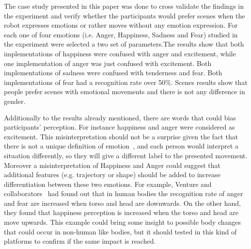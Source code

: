 The case study presented in this paper was done to cross validate the findings in the experiment and verify whether the participants would prefer scenes when the robot expresses emotions or rather moves without any emotion expression. For each one of four emotions (i.e. Anger, Happiness, Sadness and Fear) studied in the experiment were selected a two set of parameters.The results show that both implementations of happiness were confused with anger and excitement, while one implementation of anger was just confused with excitement. Both implementations of sadness were confused with tenderness and fear. Both implementations of fear had a recognition rate over 50\%. Scenes results show that people prefer scenes with emotional movements and there is not any difference in gender.

Additionally to the results already mentioned, there are words that could bias participants' perception. For instance happiness and anger were considered as excitement. This misinterpretation should not be a surprise given the fact that there is not a unique definition of emotion~\cite{Plutchik2001,cacioppo2000handbook}, and each person would interpret a situation differently, so they will give a different label to the presented movement. Moreover a misinterpretation of Happiness and Anger could suggest that additional features (e.g. trajectory or shape) should be added to increase differentiation between these two emotions. For example, Venture and collaborators~\cite{Venture2014} had found out that in human bodies the recognition rate of anger and fear are increased when torso and head are downwards. On the other hand, they found that happiness perception is increased when the torso and head are move upwards. This example could bring some insight to possible body changes that could occur in non-human like bodies, but it should tested in this kind of platforms to confirm if the same impact is reached.
 